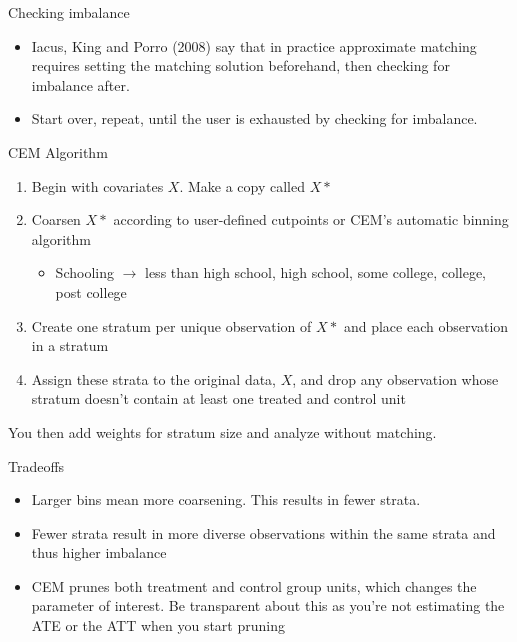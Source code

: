 \documentclass{beamer}
\begin{document}
\begin{frame}{Checking imbalance}

\begin{itemize}
\item Iacus, King and Porro (2008) say that in practice approximate matching requires setting the matching solution beforehand, then checking for imbalance after.  
\item Start over, repeat, until the user is exhausted by checking for imbalance.
\end{itemize}

\end{frame}

\begin{frame}{CEM Algorithm}
	
\begin{enumerate}
\item Begin with covariates $X$. Make a copy called $X*$
\item Coarsen $X*$ according to user-defined cutpoints or CEM's automatic binning algorithm
	\begin{itemize}
	\item Schooling $\rightarrow$ less than high school, high school, some college, college, post college
	\end{itemize}
\item Create one stratum per unique observation of $X*$ and place each observation in a stratum
\item Assign these strata to the original data, $X$, and drop any observation whose stratum doesn't contain at least one treated and control unit
\end{enumerate}

You then add weights for stratum size and analyze without matching.

\end{frame}

\begin{frame}{Tradeoffs}
	
	\begin{itemize}
	\item Larger bins mean more coarsening.  This results in fewer strata.  
	\item Fewer strata result in more diverse observations within the same strata and thus higher imbalance
	\item CEM prunes both treatment and control group units, which changes the parameter of interest.  Be transparent about this as you're not estimating the ATE or the ATT when you start pruning
	\end{itemize}
	
\end{frame}
\end{document}
